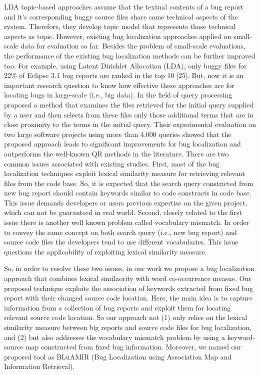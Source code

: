 \documentclass[conference]{IEEEtran}
\begin{document}
LDA topic-based approaches \cite{Anh} \cite{Lukins} assume that the textual contents of a bug report and it's corresponding buggy source files share some technical aspects of the system.
Therefore, they develop topic model that represents those technical aspects as topic. 
However, existing bug localization approaches applied on small-scale data for evaluation so far.
Besides the problem of small-scale evaluations, the performance of the existing bug localization methods can be further improved too. For example, using Latent Dirichlet Allocation (LDA), only buggy files for 22\% of Eclipse 3.1 bug reports are ranked in the top 10 [25]. 
But, now it is an important research question to know how effective these approaches are for locating bugs in large-scale (i.e., big data).
In the field of query processing
\citet{Sisman}  proposed a method that examines the files retrieved for the initial query supplied by a user and then selects from these files only those additional terms that are in close proximity to the terms in the initial query. Their \cite{Sisman} experimental evaluation on two large software projects using more than 4,000 queries showed that the proposed approach leads to significant improvements for bug localization and outperforms the well-known QR methods
in the literature.
There are two common issues associated with existing studies. First, 
most of the bug localization techniques exploit lexical similarity measure for retrieving relevant files from the code base. So, it is expected that the search query constricted from new bug report should contain keywords similar to code constructs in code base. This issue demands developers or users  previous expertise on the given project, which can not be guaranteed in real world. 
Second, closely related to the first issue there is another well known problem called vocabulary mismatch. In order to convey the same concept on both search query (i.e., new bug report) and source code files the developers tend to use different vocabularies. This issue questions the applicability of exploiting lexical similarity measure.

So, in order to resolve these two issues, in our work we propose a bug localization approach that combines lexical similaority with word co-occurrence measue. 
Our proposed technique exploits the association of keywords extracted from fixed bug report with their changed source code location. Here, the main idea is to capture information from a collection of bug reports and exploit them for locating relevant source code location.
So our approach not (1) only relies on the lexical similarity measure between big reports and source code files for bug localization, and (2) but also addresses the vocabulary mismatch problem by using a keyword-source map constructed from fixed bug information. Moreover, we named our proposed tool as BLuAMIR (Bug Localization using Association Map and Information Retrieval).
\end{document}
